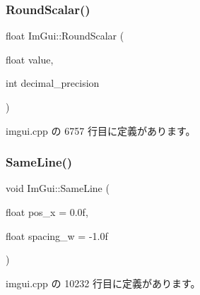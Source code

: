 \subsubsection{\texorpdfstring{Round\+Scalar()}{RoundScalar()}}
{\footnotesize\ttfamily float Im\+Gui\+::\+Round\+Scalar (\begin{DoxyParamCaption}\item[{float}]{value,  }\item[{int}]{decimal\+\_\+precision }\end{DoxyParamCaption})}



 imgui.\+cpp の 6757 行目に定義があります。

\mbox{\label{namespace_im_gui_a9a01bed1445b5b7edaf0af6a31c08d2c}} 
\subsubsection{\texorpdfstring{Same\+Line()}{SameLine()}}
{\footnotesize\ttfamily void Im\+Gui\+::\+Same\+Line (\begin{DoxyParamCaption}\item[{float}]{pos\+\_\+x = {\ttfamily 0.0f},  }\item[{float}]{spacing\+\_\+w = {\ttfamily -\/1.0f} }\end{DoxyParamCaption})}



 imgui.\+cpp の 10232 行目に定義があります。

